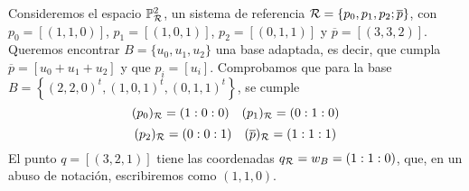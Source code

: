 
\begin{example}
    Consideremos el espacio $\mathbb{P}^2_{\mathcal{R}}$, un sistema de referencia $\mathcal{R} = \{ p_0, p_1, p_2; \overline{p}\}$, con 
    $p_0 = [(1, 1, 0)]$, $p_1 = [(1, 0, 1)]$, $p_2 = [(0, 1, 1)]$ y $\overline{p} = [(3,3,2)]$.
    Queremos encontrar $B = \{u_0, u_1, u_2\}$ una base adaptada, es decir, que cumpla $\overline{p} = [u_0+u_1+u_2]$
    y que $p_i = [u_i]$. Comprobamos que para la base $B = \left \{ (2,2,0)^t, (1,0,1)^t, (0,1,1)^t \right \}$, se cumple
    \[(p_0)_{\mathcal{R}} = (1:0:0) \quad (p_1)_{\mathcal{R}} = (0:1:0)\]
    \[(p_2)_{\mathcal{R}} = (0:0:1) \quad (\overline{p})_{\mathcal{R}} = (1:1:1)\]
    El punto $q = [(3, 2, 1)]$ tiene las coordenadas $q_{\mathcal{R}} = w_B = (1:1:0)$, que, en un abuso de notación,
    escribiremos como $(1, 1, 0)$.
\end{example}

